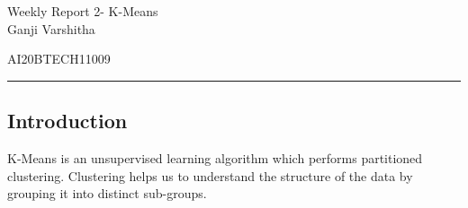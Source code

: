 \documentclass[12pt,letterpaper, onecolumn]{exam}
\begin{document}
\newtheorem{theorem}{Theorem}[section]
\newtheorem{problem}{Problem}
\newtheorem{proposition}{Proposition}[section]
\newtheorem{lemma}{Lemma}[section]
\newtheorem{corollary}[theorem]{Corollary}
\newtheorem{example}{Example}[section]
\newtheorem{definition}[problem]{Definition}

\newcommand{\BEQA}{\begin{eqnarray}}
\newcommand{\EEQA}{\end{eqnarray}}
\newcommand{\define}{\stackrel{\triangle}{=}}

\raggedbottom
\setlength{\parindent}{0pt}
\providecommand{\mbf}{\mathbf}
\providecommand{\norm}[1]{\lVert#1\rVert}
\providecommand{\pr}[1]{\ensuremath{\Pr\left(#1\right)}}
\providecommand{\qfunc}[1]{\ensuremath{Q\left(#1\right)}}
\providecommand{\sbrak}[1]{\ensuremath{{}\left[#1\right]}}
\providecommand{\lsbrak}[1]{\ensuremath{{}\left[#1\right.}}
\providecommand{\rsbrak}[1]{\ensuremath{{}\left.#1\right]}}
\providecommand{\brak}[1]{\ensuremath{\left(#1\right)}}
\providecommand{\lbrak}[1]{\ensuremath{\left(#1\right.}}
\providecommand{\rbrak}[1]{\ensuremath{\left.#1\right)}}
\providecommand{\cbrak}[1]{\ensuremath{\left\{#1\right\}}}
\providecommand{\lcbrak}[1]{\ensuremath{\left\{#1\right.}}
\providecommand{\rcbrak}[1]{\ensuremath{\left.#1\right\}}}
\let\vec\mathbf




\begingroup  
    \centering
    
    \LARGE Weekly Report 2- K-Means\\[0.5em]
    
    \large Ganji Varshitha\par
    \large AI20BTECH11009\par
\endgroup
\rule{\textwidth}{0.4pt}
\pointsdroppedatright   %
\printanswers
\newcommand\Solution{
  \textbf{Solution:}\\}
\newcommand{\myvec}[1]{\ensuremath{\begin{bmatrix}#1\end{bmatrix}}}

 \subsection*{Introduction}
K-Means is an unsupervised learning algorithm which performs partitioned clustering. Clustering helps us to understand the structure of the data by grouping it into distinct sub-groups.
\end{document}
